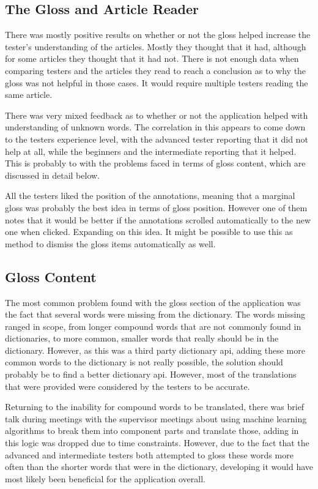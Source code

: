 \subsection{The Gloss and Article Reader}

There was mostly positive results on whether or not the gloss helped increase the tester's understanding of the articles. Mostly they thought that it had, although for some articles they thought that it had not. There is not enough data when comparing testers and the articles they read to reach a conclusion as to why the gloss was not helpful in those cases. It would require multiple testers reading the same article.

There was very mixed feedback as to whether or not the application helped with understanding of unknown words. The correlation in this appears to come down to the testers experience level, with the advanced tester reporting that it did not help at all, while the beginners and the intermediate reporting that it helped. This is probably to with the problems faced in terms of gloss content, which are discussed in detail below.

All the testers liked the position of the annotations, meaning that a marginal gloss was probably the best idea in terms of gloss position. However one of them notes that it would be better if the annotations scrolled automatically to the new one when clicked. Expanding on this idea. It might be possible to use this as method to dismiss the gloss items automatically as well. 

\subsection{Gloss Content}

The most common problem found with the gloss section of the application was the fact that several words were missing from the dictionary. The words missing ranged in scope, from longer compound words that are not commonly found in dictionaries, to more common, smaller words that really should be in the dictionary. However, as this was a third party dictionary api, adding these more common words to the dictionary is not really possible, the solution should probably be to find a better dictionary api. However,  most of the translations that were provided were considered by the testers to be accurate. 

Returning to the inability for compound words to be translated, there was brief talk during meetings with the supervisor meetings about using machine learning algorithms to break them into component parts and translate those, adding in this logic was dropped due to time constraints. However, due to the fact that the advanced and intermediate testers both attempted to gloss these words more often than the shorter words that were in the dictionary, developing it would have most likely been beneficial for the application overall. 

